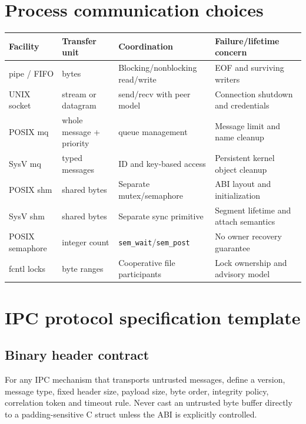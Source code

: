 \documentclass[11pt,letterpaper,oneside]{report}
\newcommand{\sys}[1]{\texttt{#1}}
\begin{document}
\chapter{Process communication choices}
\begin{longtable}{p{.19\linewidth}p{.26\linewidth}p{.22\linewidth}p{.22\linewidth}}\toprule
Facility & Transfer unit & Coordination & Failure/lifetime concern\\\midrule\endhead
pipe / FIFO & bytes & Blocking/nonblocking read/write & EOF and surviving writers\\
UNIX socket & stream or datagram & send/recv with peer model & Connection shutdown and credentials\\
POSIX mq & whole message + priority & queue management & Message limit and name cleanup\\
SysV mq & typed messages & ID and key-based access & Persistent kernel object cleanup\\
POSIX shm & shared bytes & Separate mutex/semaphore & ABI layout and initialization\\
SysV shm & shared bytes & Separate sync primitive & Segment lifetime and attach semantics\\
POSIX semaphore & integer count & \sys{sem\_wait}/\sys{sem\_post} & No owner recovery guarantee\\
fcntl locks & byte ranges & Cooperative file participants & Lock ownership and advisory model\\
\bottomrule\end{longtable}\chapter{IPC protocol specification template}
\section{Binary header contract}
For any IPC mechanism that transports untrusted messages, define a version, message type, fixed header size, payload size, byte order, integrity policy, correlation token and timeout rule. Never cast an untrusted byte buffer directly to a padding-sensitive C struct unless the ABI is explicitly controlled.
\end{document}
